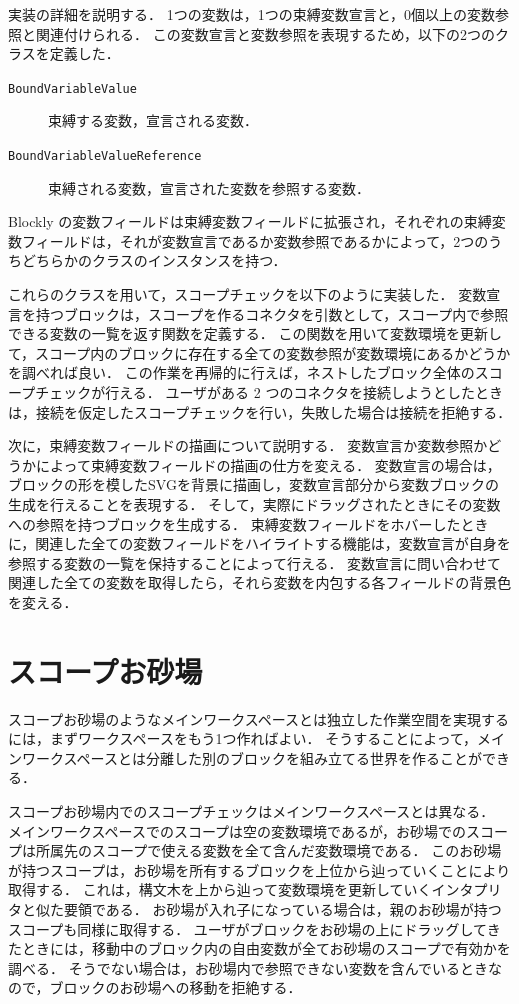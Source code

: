 実装の詳細を説明する．
1つの変数は，1つの束縛変数宣言と，0個以上の変数参照と関連付けられる．
この変数宣言と変数参照を表現するため，以下の2つのクラスを定義した．

\begin{description}
 \item[{\tt BoundVariableValue}] 束縛する変数，宣言される変数．
 \item[{\tt BoundVariableValueReference}] 束縛される変数，宣言された変数を参照する変数．
\end{description}
Blockly の変数フィールドは束縛変数フィールドに拡張され，それぞれの束縛変数フィールドは，それが変数宣言であるか変数参照であるかによって，2つのうちどちらかのクラスのインスタンスを持つ．

これらのクラスを用いて，スコープチェックを以下のように実装した．
変数宣言を持つブロックは，スコープを作るコネクタを引数として，スコープ内で参照できる変数の一覧を返す関数を定義する．
この関数を用いて変数環境を更新して，スコープ内のブロックに存在する全ての変数参照が変数環境にあるかどうかを調べれば良い．
この作業を再帰的に行えば，ネストしたブロック全体のスコープチェックが行える．
ユーザがある 2 つのコネクタを接続しようとしたときは，接続を仮定したスコープチェックを行い，失敗した場合は接続を拒絶する．

次に，束縛変数フィールドの描画について説明する．
変数宣言か変数参照かどうかによって束縛変数フィールドの描画の仕方を変える．
変数宣言の場合は，ブロックの形を模したSVGを背景に描画し，変数宣言部分から変数ブロックの生成を行えることを表現する．
そして，実際にドラッグされたときにその変数への参照を持つブロックを生成する．
束縛変数フィールドをホバーしたときに，関連した全ての変数フィールドをハイライトする機能は，変数宣言が自身を参照する変数の一覧を保持することによって行える．
変数宣言に問い合わせて関連した全ての変数を取得したら，それら変数を内包する各フィールドの背景色を変える．

\section {スコープお砂場\label{impl:osunaba}}

スコープお砂場のようなメインワークスペースとは独立した作業空間を実現するには，まずワークスペースをもう1つ作ればよい．
そうすることによって，メインワークスペースとは分離した別のブロックを組み立てる世界を作ることができる．

スコープお砂場内でのスコープチェックはメインワークスペースとは異なる．
メインワークスペースでのスコープは空の変数環境であるが，お砂場でのスコープは所属先のスコープで使える変数を全て含んだ変数環境である．
このお砂場が持つスコープは，お砂場を所有するブロックを上位から辿っていくことにより取得する．
これは，構文木を上から辿って変数環境を更新していくインタプリタと似た要領である．
お砂場が入れ子になっている場合は，親のお砂場が持つスコープも同様に取得する．
ユーザがブロックをお砂場の上にドラッグしてきたときには，移動中のブロック内の自由変数が全てお砂場のスコープで有効かを調べる．
そうでない場合は，お砂場内で参照できない変数を含んでいるときなので，ブロックのお砂場への移動を拒絶する．

